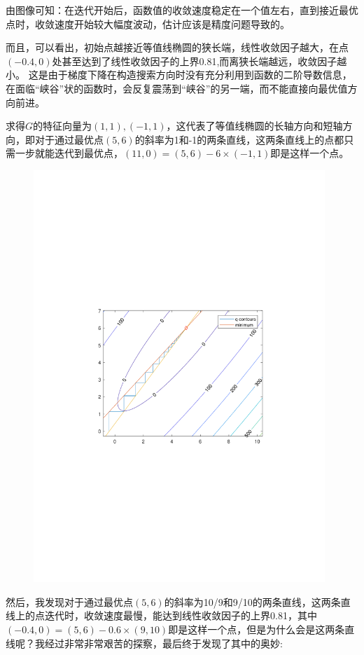 由图像可知：在迭代开始后，函数值的收敛速度稳定在一个值左右，直到接近最优点时，收敛速度开始较大幅度波动，估计应该是精度问题导致的。

而且，可以看出，初始点越接近等值线椭圆的狭长端，线性收敛因子越大，在点$(-0.4,0)$处甚至达到了线性收敛因子的上界0.81,而离狭长端越远，收敛因子越小。
这是由于梯度下降在构造搜索方向时没有充分利用到函数的二阶导数信息，在面临“峡谷”状的函数时，会反复震荡到“峡谷”的另一端，而不能直接向最优值方向前进。

求得$G$的特征向量为$(1,1),(-1,1)$，这代表了等值线椭圆的长轴方向和短轴方向，即对于通过最优点$(5,6)$的斜率为1和-1的两条直线，这两条直线上的点都只需一步就能迭代到最优点，$(11,0)=(5,6)-6\times(-1,1)$即是这样一个点。

\begin{figure}[H]
\centering
\includegraphics[width=11cm]{fig/1_6.pdf}
\end{figure}

\newpage
然后，我发现对于通过最优点$(5,6)$的斜率为10/9和9/10的两条直线，这两条直线上的点迭代时，收敛速度最慢，能达到线性收敛因子的上界0.81，其中$(-0.4,0)=(5,6)-0.6\times(9,10)$即是这样一个点，但是为什么会是这两条直线呢？我经过非常非常艰苦的探察，最后终于发现了其中的奥妙:

